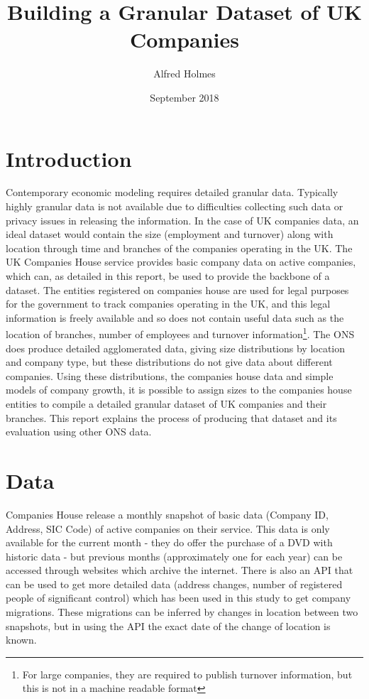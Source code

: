 \documentclass[a4paper,10pt]{article}
\title{Building a Granular Dataset of UK Companies}
\author{Alfred Holmes}
\date{September 2018}
\begin{document}
\maketitle
\section{Introduction}
Contemporary economic modeling requires detailed granular data. Typically highly granular data is not available due to difficulties collecting such data or privacy issues in releasing the information. In the case of UK companies data, an ideal dataset would contain the size (employment and turnover) along with location through time and branches of the companies operating in the UK. The UK Companies House service provides basic company data on active companies, which can, as detailed in this report, be used to provide the backbone of a dataset. The entities registered on companies house are used for legal purposes for the government to track companies operating in the UK, and this legal information is freely available and so does not contain useful data such as the location of branches, number of employees and turnover information\footnote{For large companies, they are required to publish turnover information, but this is not in a machine readable format}. The ONS does produce detailed agglomerated data, giving size distributions by location and company type, but these distributions do not give data about different companies. Using these distributions, the companies house data and simple models of company growth, it is possible to assign sizes to the companies house entities to compile a detailed granular dataset of UK companies and their branches. This report explains the process of producing that dataset and its evaluation using other ONS data.  
\section{Data}
Companies House release a monthly snapshot of basic data (Company ID, Address, SIC Code) of active companies on their service. This data is only available for the current month - they do offer the purchase of a DVD with historic data - but previous months (approximately one for each year) can be accessed through websites which archive the internet. There is also an API that can be used to get more detailed data (address changes, number of registered people of significant control) which has been used in this study to get company migrations. These migrations can be inferred by changes in location between two snapshots, but in using the API the exact date of the change of location is known. 
\end{document}
